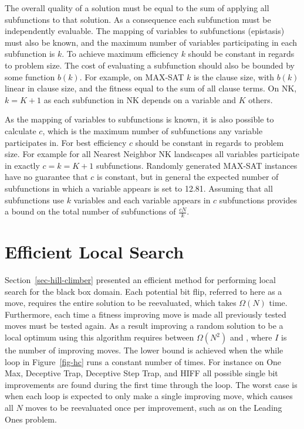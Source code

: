The overall quality of a solution must be equal to the sum of applying all subfunctions to that
solution. As a consequence each subfunction must be independently evaluable.
The mapping of variables to subfunctions (epistasis) must also be known, and
the maximum number of variables participating in each subfunction is $k$.
To achieve maximum efficiency $k$ should be constant in regards to problem size. The cost
of evaluating a subfunction should also be bounded by some function $b(k)$. For example, on MAX-SAT
$k$ is the clause size, with $b(k)$ linear in clause size, and the fitness equal to the sum of
all clause terms. On NK, $k=K+1$ as each subfunction in NK depends on a variable and $K$ others.

As the mapping of variables to subfunctions is known, it is also possible to calculate $c$, which
is the maximum number of subfunctions any variable participates in. For best efficiency $c$ should
be constant in regards to problem size. For example for all Nearest Neighbor NK landscapes all variables
participate in exactly $c=k=K+1$ subfunctions. Randomly generated MAX-SAT instances have no guarantee
that $c$ is constant, but in general the expected number of subfunctions in which a variable appears is set to 12.81.
Assuming that all subfunctions use $k$ variables and each variable appears in $c$ subfunctions
provides a bound on the total number of subfunctions of $\frac{cN}{k}$.

\section{Efficient Local Search}
\label{sec-whitley-ls}
Section~\ref{sec-hill-climber} presented an efficient method for performing local search for the black
box domain. Each potential bit flip, referred to here as a move, requires the entire solution to be reevaluated, which takes $\Omega(N)$ time.
Furthermore, each time a fitness improving move is made all previously tested moves must be tested again. As a result
improving a random solution to be a local optimum using this algorithm requires between $\Omega(N^2)$ and , where $I$ is the number
of improving moves. The lower bound is achieved when the while loop in Figure~\ref{fig-hc} runs a constant number of times.
For instance on One Max, Deceptive Trap, Deceptive Step Trap, and HIFF all possible single bit improvements are found during
the first time through the loop. The worst case is when each loop is expected to only make a single improving move, which causes
all $N$ moves to be reevaluated once per improvement, such as on the Leading Ones problem.

